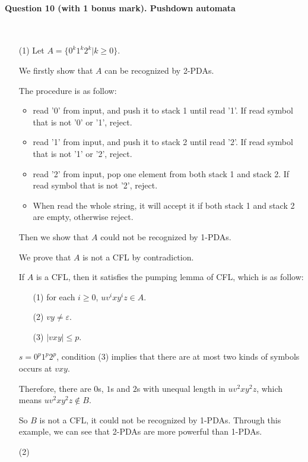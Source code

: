 \documentclass[12pt]{article}
\begin{document}
    \paragraph{Question 10 (with 1 bonus mark). Pushdown automata}~{}
    \\
    \begin{enumerate}
        \item [(1)]
    Let $A = \{ 0^{k}1^{k}2^{k} | k \ge 0 \}$. \par
    We firstly show that $A$ can be recognized by 2-PDAs. \par
    The procedure is as follow: 
    \begin{itemize}
        \item read '0' from input, and push it to stack 1 until read '1'. If read symbol that is not '0' or '1', reject.
        \item read '1' from input, and push it to stack 2 until read '2'.
        If read symbol that is not '1' or '2', reject.
        \item read '2' from input, pop one element from both stack 1 and stack 2. If read symbol that is not '2', reject. 
        \item When read the whole string, it will accept it if both stack 1 and stack 2 are empty, otherwise reject.
    \end{itemize} \par
    Then we show that $A$ could not be recognized by 1-PDAs. \par
    We prove that $A$ is not a CFL by contradiction. \par
    If $A$ is a CFL, then it satisfies the pumping lemma of CFL, which is as follow: 
    \begin{enumerate}
        \item [(1)] for each $i \ge 0$, $uv^{i}xy^{i}z \in A$.
        \item [(2)] $vy \neq \varepsilon$.
        \item [(3)] $|vxy| \le p$.
    \end{enumerate}
    $s = 0^{p}1^{p}2^{p}$, condition (3) implies that there are at most two kinds of symbols occurs at $vxy$. \par
    Therefore, there are $0$s, $1$s and $2$s with unequal length in $uv^{2}xy^{2}z$, which means $uv^{2}xy^{2}z \not \in B$. \par
    So $B$ is not a CFL, it could not be recognized by 1-PDAs.
    Through this example, we can see that 2-PDAs are more powerful than 1-PDAs.
    \item [(2)]

\end{enumerate}
\end{document}
